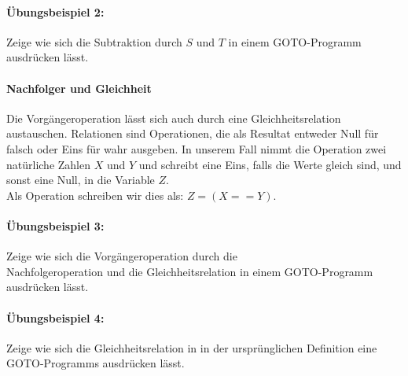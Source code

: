 \documentclass[11pt,a4paper,leqno]{report}
\numberwithin{equation}{chapter}
\begin{document}
\paragraph{\"Ubungsbeispiel 2:} Zeige wie sich die Subtraktion durch $S$ und $T$ in einem GOTO-Programm ausdr\"ucken l\"asst.
\paragraph{Nachfolger und Gleichheit} Die Vorg\"angeroperation l\"asst sich auch durch eine Gleichheitsrelation austauschen. Relationen sind Operationen, die als Resultat entweder Null f\"ur falsch oder Eins f\"ur wahr ausgeben. In unserem Fall nimmt die Operation zwei nat\"urliche Zahlen $X$ und $Y$ und schreibt eine Eins, falls die Werte gleich sind, und sonst eine Null, in die Variable $Z$. \\Als Operation schreiben wir dies als: $Z = (X == Y)$.
\paragraph{\"Ubungsbeispiel 3:} Zeige wie sich die Vorg\"angeroperation durch die\\ Nachfolgeroperation und die Gleichheitsrelation in einem GOTO-Programm ausdr\"ucken l\"asst.
\paragraph{\"Ubungsbeispiel 4:} Zeige wie sich die Gleichheitsrelation in in der urspr\"unglichen Definition eine GOTO-Programms ausdr\"ucken l\"asst.
\end{document}
